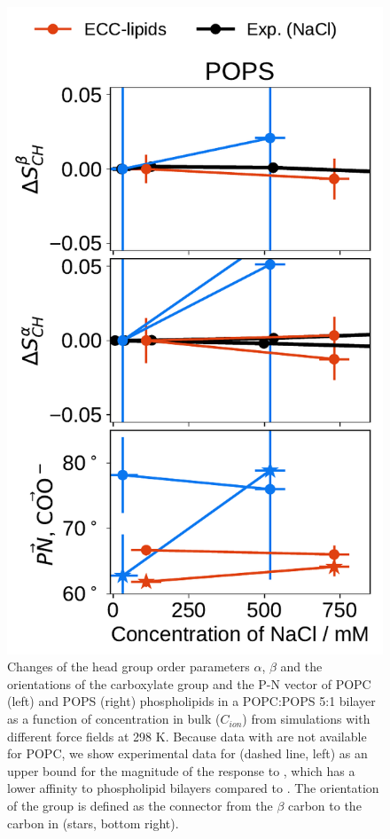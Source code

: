 \begin{figure}[tbp!]
  \includegraphics[width=\figwidthsmall]{../img/ecc_pops/order_parameters_changes_ecc-lip_L14_A-B-PN-COO_POPS_nacl.pdf} 
  \caption{\label{fig:delta_ordPar_NaCl_PCPS} 
    Changes of the head group order parameters $\alpha$, $\beta$ and the orientations of the carboxylate group and the P-N vector  
    of POPC (left) and POPS (right) phospholipids in a POPC:POPS 5:1 bilayer as a function of  concentration 
    in bulk ($C_{ion}$) from simulations with different force fields at 298 K.
    Because data with  are not available for POPC, 
    we show experimental data for  (dashed line, left) 
    as an upper bound for the magnitude of the response to , 
    which has a lower affinity to phospholipid bilayers compared to  \citep{roux90}. 
    The orientation of the  group is defined as 
    the connector from the $\beta$ carbon to the carbon in  (stars, bottom right). 
  } 
\end{figure} 


